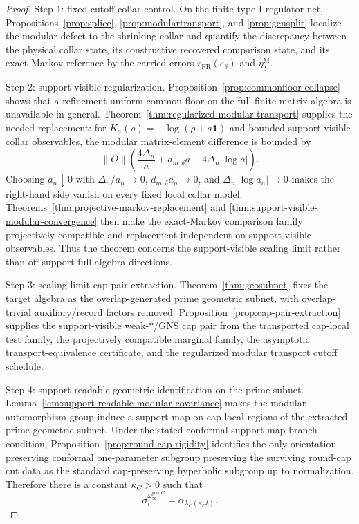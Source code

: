 \documentclass[11pt]{article}
\begin{document}
\begin{proof}
Step 1: fixed-cutoff collar control. On the finite type-I regulator net, Propositions~\ref{prop:splice}, \ref{prop:modulartransport}, and \ref{prop:gensplit} localize the modular defect to the shrinking collar and quantify the discrepancy between the physical collar state, its constructive recovered comparison state, and its exact-Markov reference by the carried errors \(r_{\mathrm{FR}}(\varepsilon_\delta)\) and \(\eta_\delta^{\mathrm M}\).

Step 2: support-visible regularization. Proposition~\ref{prop:commonfloor-collapse} shows that a refinement-uniform common floor on the full finite matrix algebra is unavailable in general. Theorem~\ref{thm:regularized-modular-transport} supplies the needed replacement: for \(K_a(\rho)=-\log(\rho+a\mathbf1)\) and bounded support-visible collar observables, the modular matrix-element difference is bounded by
\[
\|O\|\left(\frac{4\Delta_n}{a}+d_{m,\delta}a+4\Delta_n|\log a|\right).
\]
Choosing \(a_n\downarrow0\) with \(\Delta_n/a_n\to0\), \(d_{m,\delta}a_n\to0\), and \(\Delta_n|\log a_n|\to0\) makes the right-hand side vanish on every fixed local collar model. Theorems~\ref{thm:projective-markov-replacement} and \ref{thm:support-visible-modular-convergence} then make the exact-Markov comparison family projectively compatible and replacement-independent on support-visible observables. Thus the theorem concerns the support-visible scaling limit rather than off-support full-algebra directions.

Step 3: scaling-limit cap-pair extraction. Theorem~\ref{thm:geosubnet} fixes the target algebra as the overlap-generated prime geometric subnet, with overlap-trivial auxiliary/record factors removed. Proposition~\ref{prop:cap-pair-extraction} supplies the support-visible weak-\(*\)/GNS cap pair from the transported cap-local test family, the projectively compatible marginal family, the asymptotic transport-equivalence certificate, and the regularized modular transport cutoff schedule.

Step 4: support-readable geometric identification on the prime subnet. Lemma~\ref{lem:support-readable-modular-covariance} makes the modular automorphism group induce a support map on cap-local regions of the extracted prime geometric subnet. Under the stated conformal support-map branch condition, Proposition~\ref{prop:round-cap-rigidity} identifies the only orientation-preserving conformal one-parameter subgroup preserving the surviving round-cap cut data as the standard cap-preserving hyperbolic subgroup up to normalization. Therefore there is a constant \(\kappa_C>0\) such that
\[
\sigma_t^{\omega_\infty^{\mathrm{geo},C}}=\alpha_{\lambda_C(\kappa_C t)}.
\]


\end{proof}
\end{document}
